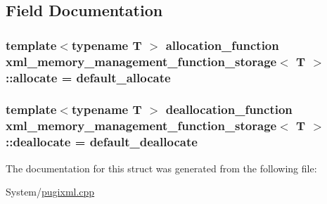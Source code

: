 \subsection{Field Documentation}
\hypertarget{structxml__memory__management__function__storage_abb6865f8d07d27fd9273737c59f6e941}{
\subsubsection[{allocate}]{\setlength{\rightskip}{0pt plus 5cm}template$<$typename T $>$ allocation\-\_\-function {\bf xml\-\_\-memory\-\_\-management\-\_\-function\-\_\-storage}$<$ T $>$\-::allocate = {\bf default\-\_\-allocate}\hspace{0.3cm}{\ttfamily [static]}}}\label{structxml__memory__management__function__storage_abb6865f8d07d27fd9273737c59f6e941}
\hypertarget{structxml__memory__management__function__storage_a1c80a9a045ed6cfb90b17a178e4b3512}{
\subsubsection[{deallocate}]{\setlength{\rightskip}{0pt plus 5cm}template$<$typename T $>$ deallocation\-\_\-function {\bf xml\-\_\-memory\-\_\-management\-\_\-function\-\_\-storage}$<$ T $>$\-::deallocate = {\bf default\-\_\-deallocate}\hspace{0.3cm}{\ttfamily [static]}}}\label{structxml__memory__management__function__storage_a1c80a9a045ed6cfb90b17a178e4b3512}


The documentation for this struct was generated from the following file\-:\begin{DoxyCompactItemize}
\item 
System/\hyperlink{pugixml_8cpp}{pugixml.\-cpp}\end{DoxyCompactItemize}
